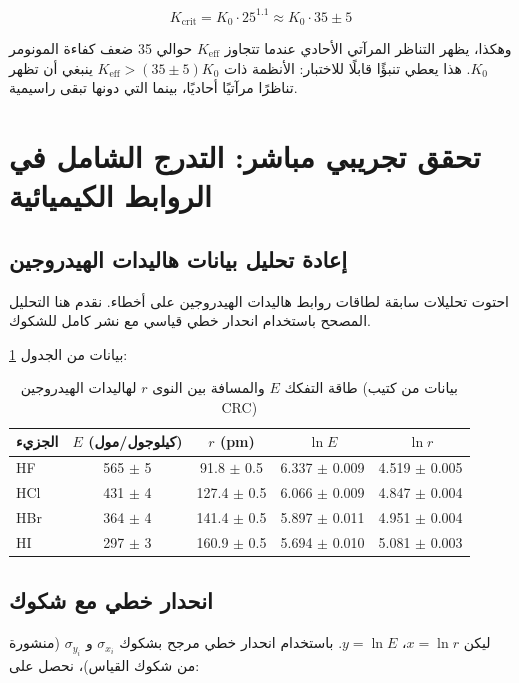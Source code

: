\documentclass[12pt,a4paper]{article}
\theoremstyle{remark}
\newcommand{\Keff}{K_{\mathrm{eff}}}
\newcommand{\Kcrit}{K_{\mathrm{crit}}}
\begin{document}
	\begin{equation}
		\Kcrit = K_0 \cdot 25^{1.1} \approx K_0 \cdot 35 \pm 5
		\label{eq:Kcrit-from-L}
	\end{equation}
	
	وهكذا، يظهر التناظر المرآتي الأحادي عندما تتجاوز $\Keff$ حوالي 35 ضعف كفاءة المونومر $K_0$. هذا يعطي تنبؤًا قابلًا للاختبار: الأنظمة ذات $\Keff > (35 \pm 5) K_0$ ينبغي أن تظهر تناظرًا مرآتيًا أحاديًا، بينما التي دونها تبقى راسيمية.
	
	\section{تحقق تجريبي مباشر: التدرج الشامل في الروابط الكيميائية}
	\label{sec:experimental-verification}
	
	\subsection{إعادة تحليل بيانات هاليدات الهيدروجين}
	
	احتوت تحليلات سابقة لطاقات روابط هاليدات الهيدروجين على أخطاء. نقدم هنا التحليل المصحح باستخدام انحدار خطي قياسي مع نشر كامل للشكوك.
	
	بيانات من الجدول \ref{tab:HX}:
	
	\begin{table}[htbp]
		\centering
		\caption{طاقة التفكك $E$ والمسافة بين النوى $r$ لهاليدات الهيدروجين (بيانات من كتيب CRC)}
		\label{tab:HX}
		\begin{tabular}{lcccc}
			\toprule
			الجزيء & $E$ (كيلوجول/مول) & $r$ (pm) & $\ln E$ & $\ln r$ \\
			\midrule
			HF & 565 $\pm$ 5 & 91.8 $\pm$ 0.5 & 6.337 $\pm$ 0.009 & 4.519 $\pm$ 0.005 \\
			HCl & 431 $\pm$ 4 & 127.4 $\pm$ 0.5 & 6.066 $\pm$ 0.009 & 4.847 $\pm$ 0.004 \\
			HBr & 364 $\pm$ 4 & 141.4 $\pm$ 0.5 & 5.897 $\pm$ 0.011 & 4.951 $\pm$ 0.004 \\
			HI  & 297 $\pm$ 3 & 160.9 $\pm$ 0.5 & 5.694 $\pm$ 0.010 & 5.081 $\pm$ 0.003 \\
			\bottomrule
		\end{tabular}
	\end{table}
	
	\subsection{انحدار خطي مع شكوك}
	
	ليكن $x = \ln r$، $y = \ln E$. باستخدام انحدار خطي مرجح بشكوك $\sigma_{x_i}$ و $\sigma_{y_i}$ (منشورة من شكوك القياس)، نحصل على:
	
\end{document}
